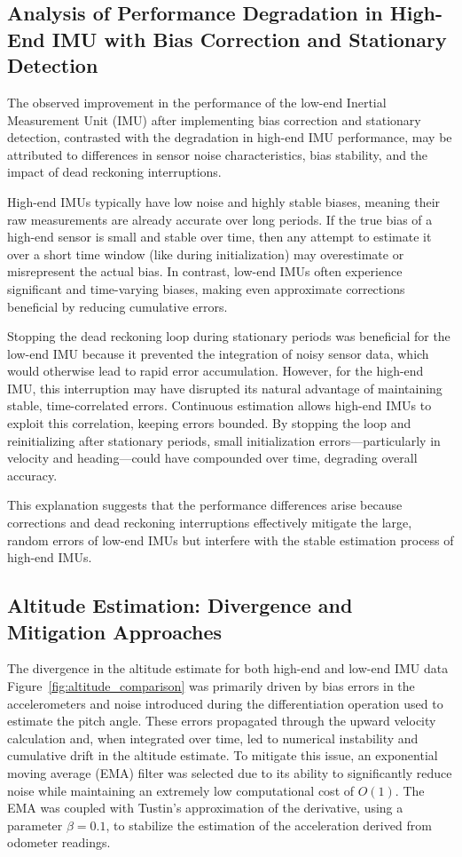 \documentclass[conference]{IEEEtran}
\begin{document}
\subsection{Analysis of Performance Degradation in High-End IMU with Bias Correction and Stationary Detection}

The observed improvement in the performance of the low-end Inertial Measurement Unit (IMU) after implementing bias correction and stationary detection, contrasted with the degradation in high-end IMU performance, may be attributed to differences in sensor noise characteristics, bias stability, and the impact of dead reckoning interruptions.

High-end IMUs typically have low noise and highly stable biases, meaning their raw measurements are already accurate over long periods. If the true bias of a high-end sensor is small and stable over time, then any attempt to estimate it over a short time window (like during initialization) may overestimate or misrepresent the actual bias. In contrast, low-end IMUs often experience significant and time-varying biases, making even approximate corrections beneficial by reducing cumulative errors.

Stopping the dead reckoning loop during stationary periods was beneficial for the low-end IMU because it prevented the integration of noisy sensor data, which would otherwise lead to rapid error accumulation. However, for the high-end IMU, this interruption may have disrupted its natural advantage of maintaining stable, time-correlated errors. Continuous estimation allows high-end IMUs to exploit this correlation, keeping errors bounded. By stopping the loop and reinitializing after stationary periods, small initialization errors—particularly in velocity and heading—could have compounded over time, degrading overall accuracy.

This explanation suggests that the performance differences arise because corrections and dead reckoning interruptions effectively mitigate the large, random errors of low-end IMUs but interfere with the stable estimation process of high-end IMUs.

\subsection{Altitude Estimation: Divergence and Mitigation Approaches}

The divergence in the altitude estimate for both high-end and low-end IMU data Figure~\ref{fig:altitude_comparison} was primarily driven by bias errors in the accelerometers and noise introduced during the differentiation operation used to estimate the pitch angle. These errors propagated through the upward velocity calculation and, when integrated over time, led to numerical instability and cumulative drift in the altitude estimate. To mitigate this issue, an exponential moving average (EMA) filter was selected due to its ability to significantly reduce noise while maintaining an extremely low computational cost of \( O(1) \). The EMA was coupled with Tustin’s approximation of the derivative, using a parameter \( \beta = 0.1 \), to stabilize the estimation of the acceleration derived from odometer readings.
\end{document}
